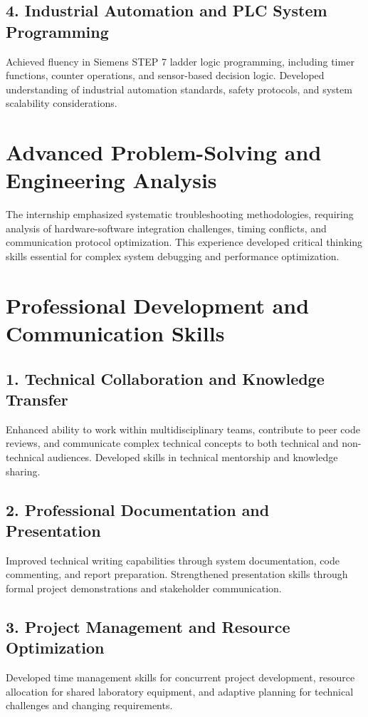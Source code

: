 \documentclass[12pt,a4paper]{report}
\begin{document}
\subsection*{4. Industrial Automation and PLC System Programming}
Achieved fluency in Siemens STEP 7 ladder logic programming, including timer functions, counter operations, and sensor-based decision logic. Developed understanding of industrial automation standards, safety protocols, and system scalability considerations.

\section{Advanced Problem-Solving and Engineering Analysis}

The internship emphasized systematic troubleshooting methodologies, requiring analysis of hardware-software integration challenges, timing conflicts, and communication protocol optimization. This experience developed critical thinking skills essential for complex system debugging and performance optimization.

\section{Professional Development and Communication Skills}

\subsection*{1. Technical Collaboration and Knowledge Transfer}
Enhanced ability to work within multidisciplinary teams, contribute to peer code reviews, and communicate complex technical concepts to both technical and non-technical audiences. Developed skills in technical mentorship and knowledge sharing.

\subsection*{2. Professional Documentation and Presentation}
Improved technical writing capabilities through system documentation, code commenting, and report preparation. Strengthened presentation skills through formal project demonstrations and stakeholder communication.

\subsection*{3. Project Management and Resource Optimization}
Developed time management skills for concurrent project development, resource allocation for shared laboratory equipment, and adaptive planning for technical challenges and changing requirements.
\end{document}
